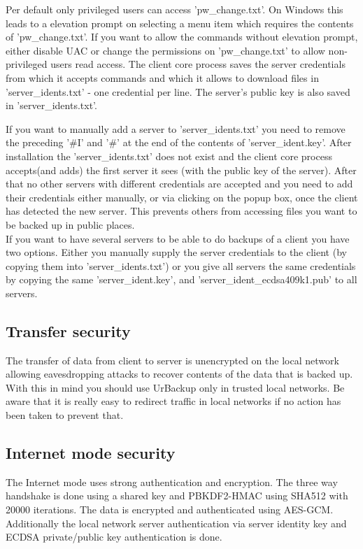 \documentclass[a4paper,10pt]{article}
\begin{document}
Per default only privileged users can access 'pw\_change.txt'. On Windows this leads to a elevation prompt on selecting a menu item which requires the contents of 'pw\_change.txt'. If you want to allow the commands without elevation prompt, either disable UAC or change the permissions on 'pw\_change.txt' to allow non-privileged users read access. 
 The client core process saves the server credentials from which it accepts commands and which it allows to download files in 'server\_idents.txt' - one credential per line. The server's public key is also saved in 'server\_idents.txt'.

If you want to manually add a server to 'server\_idents.txt' you need to remove the preceding '\#I' and '\#' at the end of the contents of 'server\_ident.key'. After installation the 'server\_idents.txt' does not exist and the client core process accepts(and adds) the first server it sees (with the public key of the server). After that no other servers with different credentials are accepted and you need to add their credentials either manually, or via clicking on the popup box, once the client has detected the new server. This prevents others from accessing files you want to be backed up in public places.\\
If you want to have several servers to be able to do backups of a client you have two options. Either you manually supply the server credentials to the client (by copying them into 'server\_idents.txt') or you give all servers the same credentials by copying the same 'server\_ident.key',  and 'server\_ident\_ecdsa409k1.pub' to all servers.

\subsection{Transfer security}

The transfer of data from client to server is unencrypted on the local
network allowing eavesdropping attacks to recover contents of the data that is
backed up. With this in mind you should use UrBackup only in trusted local
networks. Be aware that it is really easy to redirect traffic in local networks if no action has been taken to prevent that.

\subsection{Internet mode security}

The Internet mode uses strong authentication and encryption. The three way
handshake is done using a shared key and PBKDF2-HMAC using SHA512 with 20000
iterations. The data is encrypted and authenticated using AES-GCM. Additionally the local network server authentication via server identity key and ECDSA private/public key authentication is done.
\end{document}
